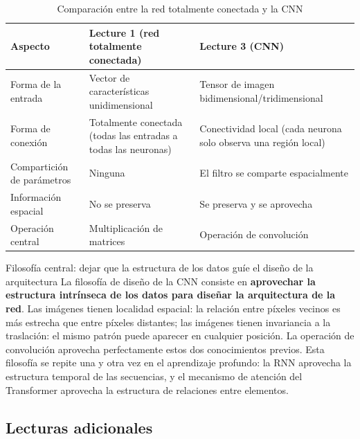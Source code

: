 \documentclass[a4paper]{article}
\begin{document}
\begin{table}[H]
\centering
\begin{tabular}{p{3cm}p{5cm}p{5cm}}
\toprule
\textbf{Aspecto} & \textbf{Lecture 1 (red totalmente conectada)} & \textbf{Lecture 3 (CNN)} \\
\midrule
Forma de la entrada & Vector de características unidimensional & Tensor de imagen bidimensional/tridimensional \\
Forma de conexión & Totalmente conectada (todas las entradas a todas las neuronas) & Conectividad local (cada neurona solo observa una región local) \\
Compartición de parámetros & Ninguna & El filtro se comparte espacialmente \\
Información espacial & No se preserva & Se preserva y se aprovecha \\
Operación central & Multiplicación de matrices & Operación de convolución \\
\bottomrule
\end{tabular}
\caption{Comparación entre la red totalmente conectada y la CNN}
\end{table}

\begin{importantbox}{Filosofía central: dejar que la estructura de los datos guíe el diseño de la arquitectura}
La filosofía de diseño de la CNN consiste en \textbf{aprovechar la estructura intrínseca de los datos para diseñar la arquitectura de la red}. Las imágenes tienen localidad espacial: la relación entre píxeles vecinos es más estrecha que entre píxeles distantes; las imágenes tienen invariancia a la traslación: el mismo patrón puede aparecer en cualquier posición. La operación de convolución aprovecha perfectamente estos dos conocimientos previos. Esta filosofía se repite una y otra vez en el aprendizaje profundo: la RNN aprovecha la estructura temporal de las secuencias, y el mecanismo de atención del Transformer aprovecha la estructura de relaciones entre elementos.
\end{importantbox}

\subsection{Lecturas adicionales}
\end{document}
